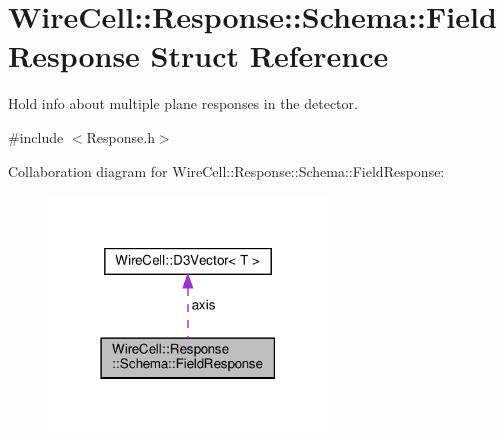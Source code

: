 \hypertarget{struct_wire_cell_1_1_response_1_1_schema_1_1_field_response}{}\section{Wire\+Cell\+:\+:Response\+:\+:Schema\+:\+:Field\+Response Struct Reference}
\label{struct_wire_cell_1_1_response_1_1_schema_1_1_field_response}


Hold info about multiple plane responses in the detector.  




{\ttfamily \#include $<$Response.\+h$>$}



Collaboration diagram for Wire\+Cell\+:\+:Response\+:\+:Schema\+:\+:Field\+Response\+:
\nopagebreak
\begin{figure}[H]
\begin{center}
\leavevmode
\includegraphics[width=210pt]{struct_wire_cell_1_1_response_1_1_schema_1_1_field_response__coll__graph}
\end{center}
\end{figure}
